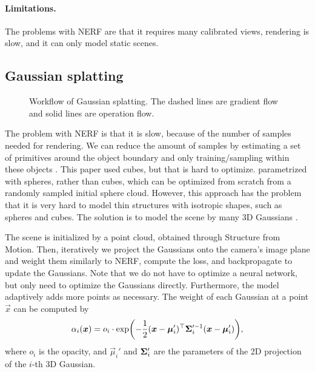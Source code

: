 \paragraph{Limitations.}

The problems with NERF are that it requires many calibrated views, rendering is slow, and it can
only model static scenes.

\subsection{Gaussian splatting}

\begin{figure}
    \centering
    \caption{Workflow of Gaussian splatting. The dashed lines are gradient flow and solid lines are operation flow.}
    \label{fig:gaussian-splatting-workflow}
\end{figure}

The problem with NERF is that it is slow, because of the number of samples needed for rendering. We
can reduce the amount of samples by estimating a set of primitives around the object boundary and
only training/sampling within these objects \citep{lombardi2021mixture}. This paper used cubes, but
that is hard to optimize. \cite{lassner2021pulsar} parametrized with spheres, rather than cubes,
which can be optimized from scratch from a randomly sampled initial sphere cloud. However, this
approach has the problem that it is very hard to model thin structures with isotropic shapes, such
as spheres and cubes. The solution is to model the scene by many 3D Gaussians \citep{kerbl20233d}.

The scene is initialized by a point cloud, obtained through Structure from Motion. Then,
iteratively we project the Gaussians onto the camera's image plane and weight them similarly to
NERF, compute the loss, and backpropagate to update the Gaussians. Note that we do not have to
optimize a neural network, but only need to optimize the Gaussians directly. Furthermore, the model
adaptively adds more points as necessary. The weight of each Gaussian at a point $\vec{x}$ can be computed by \[
    \alpha_i(\vec{x}) = o_i \cdot \exp\lft(-\frac{1}{2} \transpose{(\vec{x} - \vec{\mu}_i')} \inv{\mat{\Sigma}_i'} (\vec{x} - \vec{\mu}_i')\rgt),
\]
where $o_i$ is the opacity, and $\vec{\mu}_i'$ and $\bm{\Sigma}_i'$ are the parameters of the 2D
projection of the $i$-th 3D Gaussian.

